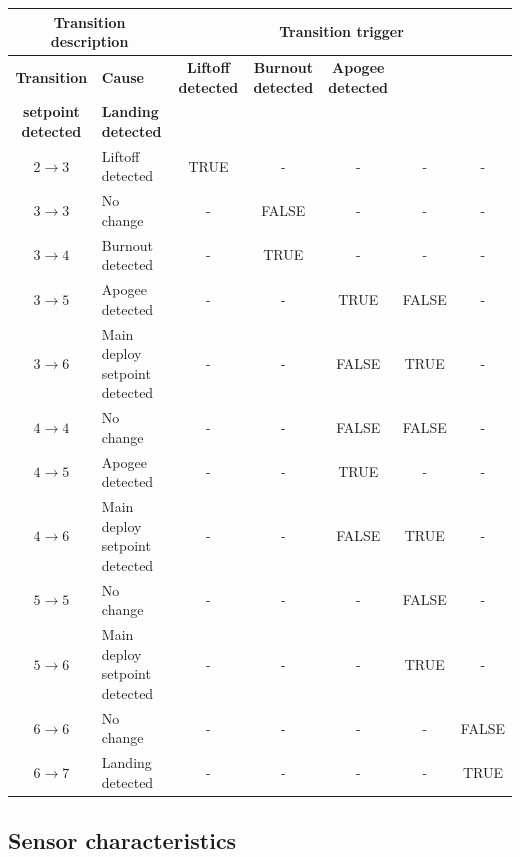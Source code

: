 \documentclass[fontsize=11pt,%
twoside,%
BCOR          = 8mm, %
DIV           = 11,  %
titlepage     = off,%
index=totoc,%
xcolor        = pdftex,%
dvipsnames,%
bibliography  = totoc,%
bibliography = numbered, %
listof        = notnumbered]{scrreprt}
\begin{document}
\begin{table}
	\label{tab:flight_state_transitions}
	\centering
		\begin{tabular}{|c|l||c|c|c|c|c|} \hline
			\multicolumn{2}{|c||}{\textbf{Transition description}} & \multicolumn{5}{c|}{\textbf{Transition trigger}}\\ \hline
			\textbf{Transition} & \textbf{Cause} & \textbf{Liftoff detected} & \textbf{Burnout detected} & \textbf{Apogee detected} & \makecell{\textbf{Main deploy}\\ \textbf{setpoint detected}} & \textbf{Landing detected} \\ \hline \hline
			$2\rightarrow3$ & Liftoff detected & TRUE & - & - & - & - \\ \hline
			$3\rightarrow3$ & No change & - & FALSE & - & - & - \\ \hline
			$3\rightarrow4$ & Burnout detected & - & TRUE & - & - & - \\ \hline
			$3\rightarrow5$ & Apogee detected & - & - & TRUE & FALSE & - \\ \hline
			$3\rightarrow6$ & Main deploy setpoint detected & - & - & FALSE & TRUE & - \\ \hline
			$4\rightarrow4$ & No change & - & - & FALSE & FALSE & -\\ \hline
			$4\rightarrow5$ & Apogee detected & - & - & TRUE & - & -\\ \hline
			$4\rightarrow6$ & Main deploy setpoint detected & - & - & FALSE & TRUE & -\\ \hline
			$5\rightarrow5$ & No change & - & - & - & FALSE & -\\ \hline
			$5\rightarrow6$ & Main deploy setpoint detected & - & - & - & TRUE & - \\ \hline
			$6\rightarrow6$ & No change & - & - & - & - & FALSE\\ \hline
			$6\rightarrow7$ & Landing detected & - & - & - & - & TRUE\\ \hline
		\end{tabular}
\end{table}

\newpage

\subsection{Sensor characteristics}
\end{document}
